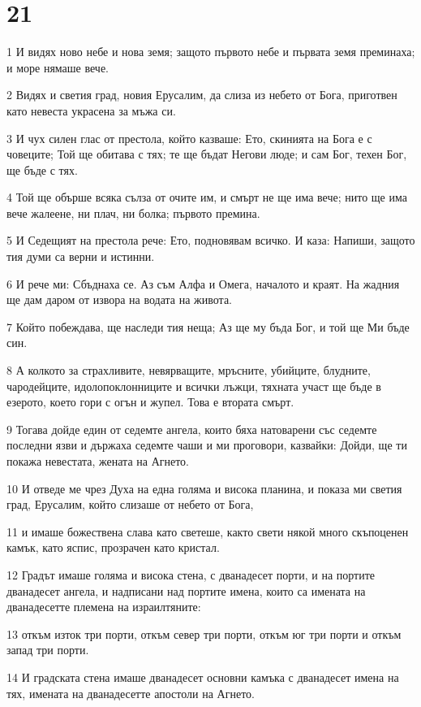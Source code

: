 \chapter{21}

\par 1 И видях ново небе и нова земя; защото първото небе и първата земя преминаха; и море нямаше вече.
\par 2 Видях и светия град, новия Ерусалим, да слиза из небето от Бога, приготвен като невеста украсена за мъжа си.
\par 3 И чух силен глас от престола, който казваше: Ето, скинията на Бога е с човеците; Той ще обитава с тях; те ще бъдат Негови люде; и сам Бог, техен Бог, ще бъде с тях.
\par 4 Той ще обърше всяка сълза от очите им, и смърт не ще има вече; нито ще има вече жалеене, ни плач, ни болка; първото премина.
\par 5 И Седещият на престола рече: Ето, подновявам всичко. И каза: Напиши, защото тия думи са верни и истинни.
\par 6 И рече ми: Сбъднаха се. Аз съм Алфа и Омега, началото и краят. На жадния ще дам даром от извора на водата на живота.
\par 7 Който побеждава, ще наследи тия неща; Аз ще му бъда Бог, и той ще Ми бъде син.
\par 8 А колкото за страхливите, невярващите, мръсните, убийците, блудните, чародейците, идолопоклонниците и всички лъжци, тяхната участ ще бъде в езерото, което гори с огън и жупел. Това е втората смърт.
\par 9 Тогава дойде един от седемте ангела, които бяха натоварени със седемте последни язви и държаха седемте чаши и ми проговори, казвайки: Дойди, ще ти покажа невестата, жената на Агнето.
\par 10 И отведе ме чрез Духа на една голяма и висока планина, и показа ми светия град, Ерусалим, който слизаше от небето от Бога,
\par 11 и имаше божествена слава като светеше, както свети някой много скъпоценен камък, като яспис, прозрачен като кристал.
\par 12 Градът имаше голяма и висока стена, с дванадесет порти, и на портите дванадесет ангела, и надписани над портите имена, които са имената на дванадесетте племена на израилтяните:
\par 13 откъм изток три порти, откъм север три порти, откъм юг три порти и откъм запад три порти.
\par 14 И градската стена имаше дванадесет основни камъка с дванадесет имена на тях, имената на дванадесетте апостоли на Агнето.
